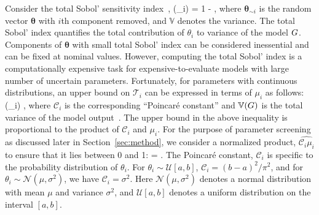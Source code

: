 Consider the total 
Sobol' sensitivity index~\cite{Sobol:2001},
\be
{}(\theta_i) = 1 - 
,
\label{eq:total}
\ee
where $\bm{\theta}_{\sim i}$ is the random vector $\bm\theta$ with $i$th component removed, 
and $\mathbb{V}$ denotes the variance. The total Sobol' index quantifies the total contribution 
of $\theta_i$ to variance of the model $G$. Components of $\bm\theta$ with small 
total Sobol' index can be considered inessential and can be fixed at nominal values. However, 
computing the total Sobol' index is a computationally expensive task for expensive-to-evaluate 
models with large number of uncertain parameters. Fortunately, 
for parameters with continuous distributions, an upper bound on $\mathcal{T}_i$  
can be expressed in terms of $\mu_i$ as follows: 
\be
{}(\theta_i) \leq {},
\label{eq:bound}
\ee
where $\mathcal{C}_i$ is the corresponding ``Poincar\'e constant''
and
$\mathbb{V}(G)$ is the total variance of the model
output~\cite{Lamboni:2013}.  The upper bound in the above inequality is
proportional to the product of $\mathcal{C}_i$ and $\mu_i$.  For the purpose of
parameter screening as discussed later in Section~\ref{sec:method}, we consider
a normalized product, $\widehat{\mathcal{C}_i\mu_i}$ to ensure that it lies
between 0 and 1:
\be
{} = .
\label{eq:cmu}
\ee
The Poincar\'e constant, $\mathcal{C}_i$ is specific to the probability
distribution of $\theta_i$. For $\theta_i \sim \mathcal{U}[a, b]$,
$\mathcal{C}_i = (b-a)^{2}/\pi^2$, and for  
$\theta_i \sim \mathcal{N}(\mu,\sigma^2)$, we have $\mathcal{C}_i = \sigma^2$. 
Here $\mathcal{N}(\mu,\sigma^2)$ denotes a normal distribution with mean $\mu$
and variance $\sigma^2$, and $\mathcal{U}[a,b]$ denotes a uniform distribution
on the interval $[a, b]$.

%

